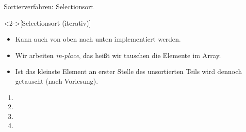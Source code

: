 \def\List#1#2{
    \foreach[count=\i,remember=\i as \li(initially 0)] \n in {#1}{
        \ifnum\i>#2
            \node[inner sep=4pt,ball,outer sep=2pt] (\i) at(1.25*\i,0) {\n};
        \else
            \node[inner sep=4pt,iball,outer sep=2pt] (\i) at(1.25*\i,0) {\n};
        \fi
        \ifnum\i>1
            \draw (\li.east) -- (\i.west);
        \fi
    }
}

\begin{frame}{Sortierverfahren: Selectionsort}
    \begin{definition}<2->[Selectionsort \hfill{}(iterativ)]
    \end{definition}
    \begin{itemize}
        \item<5-> Kann auch von oben nach unten implementiert werden.
        \item<6-> Wir arbeiten \emph{in-place}, das heißt wir tauschen die Elemente im Array.
        \item<7-> Ist das kleinste Element an erster Stelle des unsortierten Teils wird dennoch getauscht (nach Vorlesung).
    \end{itemize}
    \vfill
    \begin{center}
\begin{minipage}{.9\linewidth}
\begin{multicols}{2}
    \begin{enumerate}
        \item<8-> 
        \item<9-> 
        \item<10-> 
        \item<11-> 
    \end{enumerate}
\end{multicols}
\end{minipage}
    \end{center}
\end{frame}



